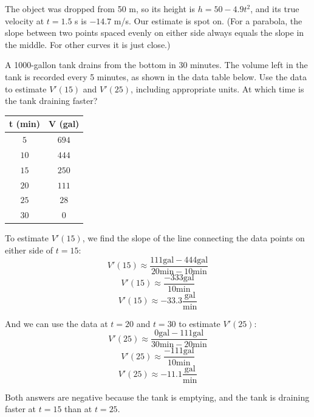 The object was dropped from 50 m, so its height is $h = 50 - 4.9t^2$, and its
true velocity at $t = 1.5$ s is $-14.7$ m/s. Our estimate is spot on. (For a
parabola, the slope between two points spaced evenly on either side always
equals the slope in the middle. For other curves it is just close.)

\begin{Worked}
\begin{Problem}
A 1000-gallon tank drains from the bottom in 30 minutes. The
volume left in the tank is recorded every 5 minutes, as shown in the data 
table below. Use the data to estimate $V'(15)$ and $V'(25)$, including 
appropriate units. At which time is the tank draining faster?

\begin{center}
\begin{tabular}{|c|c|}
\hline
t (min) & V (gal)\\\hline
$5$ & $694$\\\hline
$10$ & $444$\\\hline
$15$ & $250$\\\hline
$20$ & $111$\\\hline
$25$ & $28$\\\hline
$30$ & $0$\\\hline
\end{tabular}
\end{center}
\end{Problem}
\begin{Solution}
To estimate $V'(15)$, we find the slope of the line
connecting the data points on either side of $t = 15$:
$$V'(15) \approx \frac{111\text{gal} - 444\text{gal}}{20\text{min} - 10
\text{min}}$$
$$V'(15) \approx \frac{-333\text{gal}}{10\text{min}}$$
$$V'(15) \approx -33.3 \frac{\text{gal}}{\text{min}}$$

And we can use the data at $t = 20$ and $t = 30$ to estimate $V'(25)$:
$$V'(25) \approx \frac{0\text{gal} - 111\text{gal}}{30\text{min} - 20
\text{min}}$$
$$V'(25) \approx \frac{-111\text{gal}}{10\text{min}}$$
$$V'(25) \approx -11.1 \frac{\text{gal}}{\text{min}}$$

Both answers are negative because the tank is emptying, and the tank is 
draining faster at $t = 15$ than at $t = 25$. 
\end{Solution}
\end{Worked}

